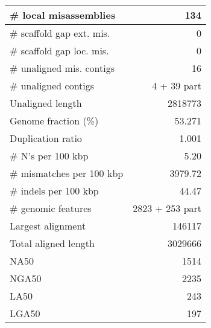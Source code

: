\documentclass[12pt,a4paper]{article}
\begin{document}
\begin{table}[ht]
\begin{center}
\begin{tabular}{|l*{1}{|r}|}
\# local misassemblies & 134 \\ \hline
\# scaffold gap ext. mis. & 0 \\ \hline
\# scaffold gap loc. mis. & 0 \\ \hline
\# unaligned mis. contigs & 16 \\ \hline
\# unaligned contigs & 4 + 39 part \\ \hline
Unaligned length & 2818773 \\ \hline
Genome fraction (\%) & 53.271 \\ \hline
Duplication ratio & 1.001 \\ \hline
\# N's per 100 kbp & 5.20 \\ \hline
\# mismatches per 100 kbp & 3979.72 \\ \hline
\# indels per 100 kbp & 44.47 \\ \hline
\# genomic features & 2823 + 253 part \\ \hline
Largest alignment & 146117 \\ \hline
Total aligned length & 3029666 \\ \hline
NA50 & 1514 \\ \hline
NGA50 & 2235 \\ \hline
LA50 & 243 \\ \hline
LGA50 & 197 \\ \hline
\end{tabular}
\end{center}
\end{table}
\end{document}

